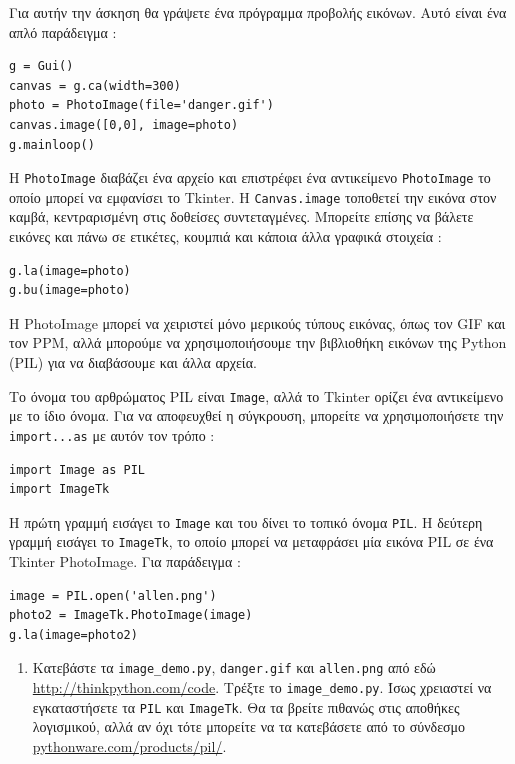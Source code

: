 \documentclass[10pt]{book}
\begin{document}
\begin{exercise}

Για αυτήν την άσκηση θα γράψετε ένα πρόγραμμα προβολής εικόνων.  Αυτό είναι ένα απλό παράδειγμα :

\begin{verbatim}
g = Gui()
canvas = g.ca(width=300)
photo = PhotoImage(file='danger.gif')
canvas.image([0,0], image=photo)
g.mainloop()
\end{verbatim}
%
 Η  {\tt PhotoImage}  διαβάζει ένα αρχείο και επιστρέφει ένα αντικείμενο  {\tt PhotoImage}  το οποίο μπορεί να εμφανίσει το  Tkinter.   Η  {\tt Canvas.image}  τοποθετεί την εικόνα στον καμβά, κεντραρισμένη στις δοθείσες συντεταγμένες.  Μπορείτε επίσης να βάλετε εικόνες και πάνω σε ετικέτες, κουμπιά και κάποια άλλα γραφικά στοιχεία :

\begin{verbatim}
g.la(image=photo)
g.bu(image=photo)
\end{verbatim}
%
 Η  PhotoImage  μπορεί να χειριστεί μόνο μερικούς τύπους εικόνας, όπως τον  GIF  και τον  PPM,  αλλά μπορούμε να χρησιμοποιήσουμε την βιβλιοθήκη εικόνων της  Python (PIL)  για να διαβάσουμε και άλλα αρχεία.

Το όνομα του αρθρώματος  PIL  είναι  {\tt Image},  αλλά το  Tkinter  ορίζει 
ένα αντικείμενο με το ίδιο όνομα.  Για να αποφευχθεί η σύγκρουση, μπορείτε να χρησιμοποιήσετε την  {\tt import...as}  με αυτόν τον τρόπο :

\begin{verbatim}
import Image as PIL
import ImageTk
\end{verbatim}
%
 Η πρώτη γραμμή εισάγει το  {\tt Image}  και του δίνει το τοπικό όνομα  {\tt PIL}.   Η δεύτερη γραμμή εισάγει το  {\tt ImageTk},  το οποίο μπορεί να μεταφράσει 
μία εικόνα  PIL  σε ένα  Tkinter PhotoImage.   Για παράδειγμα :

\begin{verbatim}
image = PIL.open('allen.png')
photo2 = ImageTk.PhotoImage(image)
g.la(image=photo2)
\end{verbatim}
%

 
\begin{enumerate}

\item Κατεβάστε τα \verb"image_demo.py", \verb"danger.gif" και \verb"allen.png" από εδώ \url{http://thinkpython.com/code}. Τρέξτε το  \verb"image_demo.py". Ίσως χρειαστεί να εγκαταστήσετε τα {\tt PIL} και {\tt ImageTk}.  Θα τα βρείτε πιθανώς στις αποθήκες λογισμικού, αλλά αν όχι τότε μπορείτε να τα κατεβάσετε από το 
σύνδεσμο \url{pythonware.com/products/pil/}. 


\end{enumerate}
\end{exercise}
\end{document}
